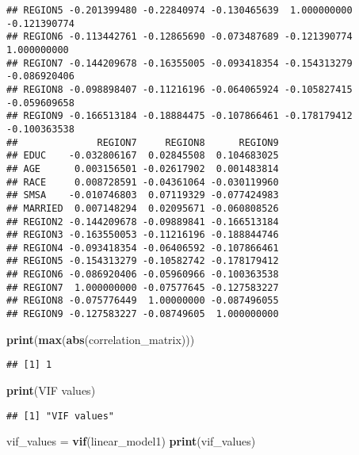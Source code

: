 \documentclass[
]{article}
\newenvironment{Shaded}{\begin{snugshade}}{\end{snugshade}}
\newcommand{\FunctionTok}[1]{\textcolor[rgb]{0.13,0.29,0.53}{\textbf{#1}}}
\newcommand{\NormalTok}[1]{#1}
\newcommand{\OtherTok}[1]{\textcolor[rgb]{0.56,0.35,0.01}{#1}}
\newcommand{\StringTok}[1]{\textcolor[rgb]{0.31,0.60,0.02}{#1}}
\begin{document}
\begin{verbatim}
## REGION5 -0.201399480 -0.22840974 -0.130465639  1.000000000 -0.121390774
## REGION6 -0.113442761 -0.12865690 -0.073487689 -0.121390774  1.000000000
## REGION7 -0.144209678 -0.16355005 -0.093418354 -0.154313279 -0.086920406
## REGION8 -0.098898407 -0.11216196 -0.064065924 -0.105827415 -0.059609658
## REGION9 -0.166513184 -0.18884475 -0.107866461 -0.178179412 -0.100363538
##              REGION7     REGION8      REGION9
## EDUC    -0.032806167  0.02845508  0.104683025
## AGE      0.003156501 -0.02617902  0.001483814
## RACE     0.008728591 -0.04361064 -0.030119960
## SMSA    -0.010746803  0.07119329 -0.077424983
## MARRIED  0.007148294  0.02095671 -0.060808526
## REGION2 -0.144209678 -0.09889841 -0.166513184
## REGION3 -0.163550053 -0.11216196 -0.188844746
## REGION4 -0.093418354 -0.06406592 -0.107866461
## REGION5 -0.154313279 -0.10582742 -0.178179412
## REGION6 -0.086920406 -0.05960966 -0.100363538
## REGION7  1.000000000 -0.07577645 -0.127583227
## REGION8 -0.075776449  1.00000000 -0.087496055
## REGION9 -0.127583227 -0.08749605  1.000000000
\end{verbatim}

\begin{Shaded}
\begin{Highlighting}[]
\FunctionTok{print}\NormalTok{(}\FunctionTok{max}\NormalTok{(}\FunctionTok{abs}\NormalTok{(correlation\_matrix)))}
\end{Highlighting}
\end{Shaded}

\begin{verbatim}
## [1] 1
\end{verbatim}

\begin{Shaded}
\begin{Highlighting}[]
\FunctionTok{print}\NormalTok{(}\StringTok{\textquotesingle{}VIF values\textquotesingle{}}\NormalTok{)}
\end{Highlighting}
\end{Shaded}

\begin{verbatim}
## [1] "VIF values"
\end{verbatim}

\begin{Shaded}
\begin{Highlighting}[]
\NormalTok{vif\_values }\OtherTok{=} \FunctionTok{vif}\NormalTok{(linear\_model1)}
\FunctionTok{print}\NormalTok{(vif\_values)}
\end{Highlighting}
\end{Shaded}
\end{document}
